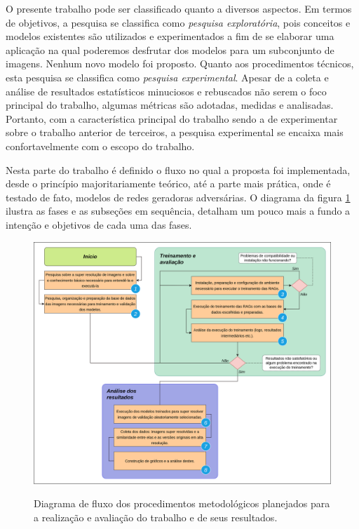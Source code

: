 \label{procedimentos}

O presente trabalho pode ser classificado quanto a diversos aspectos. Em termos de objetivos, a pesquisa se classifica como \textit{pesquisa exploratória}, pois conceitos e modelos existentes são utilizados e experimentados a fim de se elaborar uma aplicação na qual poderemos desfrutar dos modelos para um subconjunto de imagens. Nenhum novo modelo foi proposto. Quanto aos procedimentos técnicos, esta pesquisa se classifica como \textit{pesquisa experimental}. Apesar de a coleta e análise de resultados estatísticos minuciosos e rebuscados não serem o foco principal do trabalho, algumas métricas são adotadas, medidas e analisadas. Portanto, com a característica principal do trabalho sendo a de experimentar sobre o trabalho anterior de terceiros, a pesquisa experimental se encaixa mais confortavelmente com o escopo do trabalho.

Nesta parte do trabalho é definido o fluxo no qual a proposta foi implementada, desde o princípio majoritariamente teórico, até a parte mais prática, onde é testado de fato, modelos de redes geradoras adversárias. O diagrama da figura \ref{fig:fig9} ilustra as fases e as subseções em sequência, detalham um pouco mais a fundo a intenção e objetivos de cada uma das fases.

\begin{figure}
    \centering
    \caption{Diagrama de fluxo dos procedimentos metodológicos planejados para a realização e avaliação do trabalho e de seus resultados.}
    \includegraphics[width=14cm]{fig/flow_diagram_development.png}
    \label{fig:fig9}
\end{figure}

